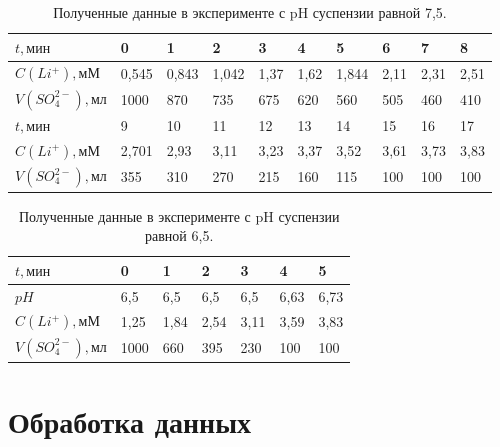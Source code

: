 \documentclass[a4paper,12pt]{article} %
\begin{document}
\begin{table}[H]
    \centering
    \begin{tabular}{|l|l|l|l|l|l|l|l|l|l|}
    \hline
          $t, \textrm{мин}$& 0 & 1 & 2 & 3 & 4 & 5 & 6 & 7 & 8   \\ \hline
       $C(Li^{+}), \textrm{мМ}$ & 0,545 & 0,843 & 1,042 & 1,37 & 1,62 & 1,844 & 2,11 & 2,31 & 2,51 \\ \hline
        $V(SO_4^{2-}), \textrm{мл}$ & 1000 & 870 & 735 & 675 & 620 & 560 & 505 & 460 & 410  \\ \hline
        $t, \textrm{мин}$&  9 & 10 & 11 & 12 & 13 & 14 & 15 & 16 & 17   \\ \hline
       $C(Li^{+}), \textrm{мМ}$  & 2,701 & 2,93 & 3,11 & 3,23 & 3,37 & 3,52 & 3,61 & 3,73 & 3,83 \\ \hline
        $V(SO_4^{2-}), \textrm{мл}$  & 355 & 310 & 270 & 215 & 160 & 115 & 100 & 100 & 100 \\ \hline
    \end{tabular}
    \caption{Полученные данные в эксперименте с pH суспензии равной 7,5.}
	\label{tab:3}
\end{table}

\begin{table}[H]
    \centering
    \begin{tabular}{|l|l|l|l|l|l|l|}
    \hline
          $t, \textrm{мин}$& 0 & 1 & 2 & 3 & 4 & 5  \\ \hline
          $pH$ & 6,5 & 6,5 & 6,5 & 6,5 & 6,63 & 6,73 \\ \hline
       $C(Li^{+}), \textrm{мМ}$ & 1,25 & 1,84 & 2,54 & 3,11 & 3,59 & 3,83 \\ \hline
        $V(SO_4^{2-}), \textrm{мл}$ & 1000 & 660 & 395 & 230 & 100 & 100  \\ \hline
    \end{tabular}
    \caption{Полученные данные в эксперименте с pH суспензии равной 6,5.}
	\label{tab:4}
\end{table}



\section{Обработка данных}
\end{document}
